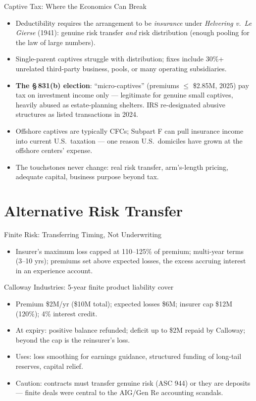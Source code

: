 \documentclass[11pt, aspectratio=169]{beamer}
\begin{document}
\begin{frame}{Captive Tax: Where the Economics Can Break}
\begin{itemize}
  \item Deductibility requires the arrangement to be \emph{insurance} under \emph{Helvering v.\ Le Gierse} (1941): genuine \alert{risk transfer} \emph{and} \alert{risk distribution} (enough pooling for the law of large numbers).
  \item Single-parent captives struggle with distribution; fixes include 30\%+ unrelated third-party business, pools, or many operating subsidiaries.
  \item \textbf{The \S\,831(b) election}: ``micro-captives'' (premiums $\le$ \$2.85M, 2025) pay tax on investment income only --- legitimate for genuine small captives, heavily abused as estate-planning shelters. IRS re-designated abusive structures as listed transactions in 2024.
  \item Offshore captives are typically CFCs; Subpart F can pull insurance income into current U.S.\ taxation --- one reason U.S.\ domiciles have grown at the offshore centers' expense.
  \item The touchstones never change: \alert{real risk transfer, arm's-length pricing, adequate capital, business purpose beyond tax}.
\end{itemize}
\end{frame}

\section{Alternative Risk Transfer}

\begin{frame}{Finite Risk: Transferring Timing, Not Underwriting}
\begin{itemize}
  \item Insurer's maximum loss capped at 110--125\% of premium; multi-year terms (3--10 yrs); premiums set above expected losses, the excess accruing interest in an \alert{experience account}.
\end{itemize}
\begin{exampleblock}{Calloway Industries: 5-year finite product liability cover}
\begin{itemize}
  \item Premium \$2M/yr (\$10M total); expected losses \$6M; insurer cap \$12M (120\%); 4\% interest credit.
  \item At expiry: positive balance refunded; deficit up to \$2M repaid by Calloway; beyond the cap is the reinsurer's loss.
\end{itemize}
\end{exampleblock}
\begin{itemize}
  \item Uses: loss smoothing for earnings guidance, structured funding of long-tail reserves, capital relief.
  \item \alert{Caution}: contracts must transfer genuine risk (ASC 944) or they are deposits --- finite deals were central to the AIG/Gen Re accounting scandals.
\end{itemize}
\end{frame}
\end{document}
